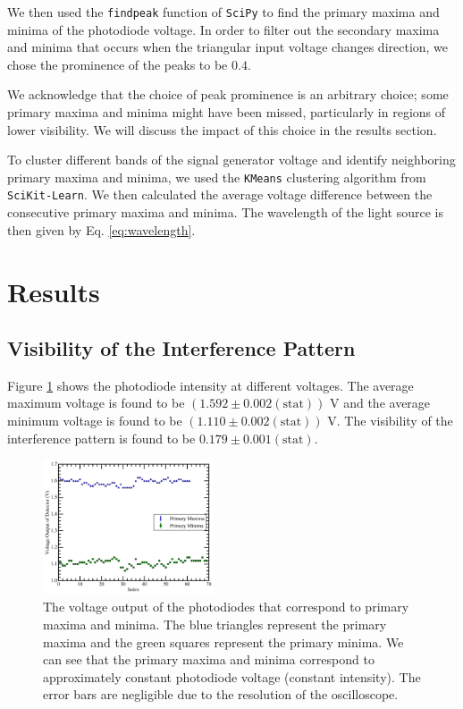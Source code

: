 We then used the \texttt{findpeak} function of \texttt{SciPy} to find the primary maxima and minima of the photodiode voltage. In order to filter out the secondary maxima and minima that occurs when the triangular input voltage changes direction, we chose the prominence of the peaks to be $0.4$. 

We acknowledge that the choice of peak prominence is an arbitrary choice; some primary maxima and minima might have been missed, particularly in regions of lower visibility. We will discuss the impact of this choice in the results section.

To cluster different bands of the signal generator voltage and identify neighboring primary maxima and minima, we used the \texttt{KMeans} clustering algorithm from \texttt{SciKit-Learn}. We then calculated the average voltage difference between the consecutive primary maxima and minima. The wavelength of the light source is then given by Eq. \eqref{eq:wavelength}. 


\section{Results}
\subsection{Visibility of the Interference Pattern}

Figure \ref{fig:intensity} shows the photodiode intensity at different voltages. The average maximum voltage is found to be $(1.592\pm0.002(\text{stat})) \text{ V}$ and the average minimum voltage is found to be $(1.110\pm0.002(\text{stat})) \text{ V}$. The visibility of the interference pattern is found to be $0.179\pm0.001(\text{stat})$.
\begin{figure}[h]
    \centering
    \includegraphics[width=0.45\textwidth]{fig/Intensity.png}
    \caption{The voltage output of the photodiodes that correspond to primary maxima and minima. The blue triangles represent the primary maxima and the green squares represent the primary minima. We can see that the primary maxima and minima correspond to approximately constant photodiode voltage (constant intensity). The error bars are negligible due to the resolution of the oscilloscope.}
    \label{fig:intensity}
\end{figure}

